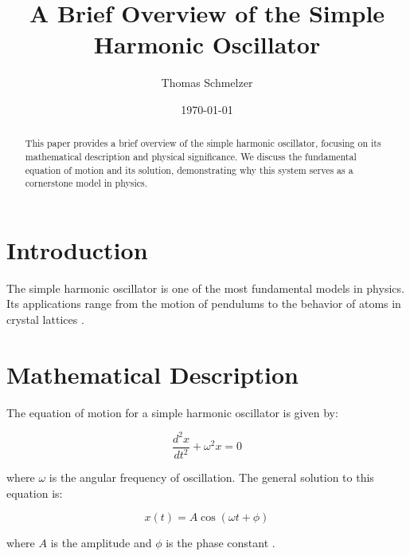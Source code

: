\documentclass{article}  %
\title{A Brief Overview of the Simple Harmonic Oscillator}  %
\author{Thomas Schmelzer}                                   %
\date{\today}                                               %
\begin{document}
\maketitle  %

\thispagestyle{fancy}  %

\begin{abstract}
This paper provides a brief overview of the simple harmonic oscillator,
focusing on its mathematical description and physical significance. We discuss
the fundamental equation of motion and its solution, demonstrating why this
system serves as a cornerstone model in physics.
\end{abstract}

\section{Introduction}
The simple harmonic oscillator is one of the most fundamental models in physics.
Its applications range from the motion of pendulums to the behavior of atoms
in crystal lattices \citep{feynman1963}.  %

\section{Mathematical Description}
The equation of motion for a simple harmonic oscillator is given by:

\begin{equation}
    \frac{d^2x}{dt^2} + \omega^2x = 0
\end{equation}

where $\omega$ is the angular frequency of oscillation. The general solution
to this equation is:

\begin{equation}
    x(t) = A\cos(\omega t + \phi)
\end{equation}

where $A$ is the amplitude and $\phi$ is the phase constant
\citep{goldstein2002}.  %
\end{document}
